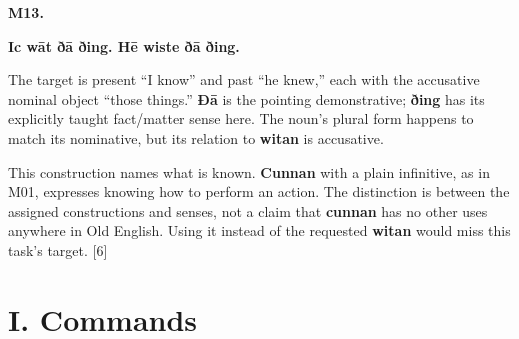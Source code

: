 \par\begin{minipage}{\linewidth}\raggedright
\textbf{M13.}

\textbf{Ic wāt ðā ðing. Hē wiste ðā ðing.}

The target is present “I know” and past “he knew,” each with the accusative nominal object “those things.” \textbf{Ðā} is the pointing demonstrative; \textbf{ðing} has its explicitly taught fact/\allowbreak{}matter sense here. The noun’s plural form happens to match its nominative, but its relation to \textbf{witan} is accusative.

This construction names what is known. \textbf{Cunnan} with a plain infinitive, as in M01, expresses knowing how to perform an action. The distinction is between the assigned constructions and senses, not a claim that \textbf{cunnan} has no other uses anywhere in Old English. Using it instead of the requested \textbf{witan} would miss this task’s target. [6]

\end{minipage}\par\addvspace{4pt}

\section*{I. Commands}

